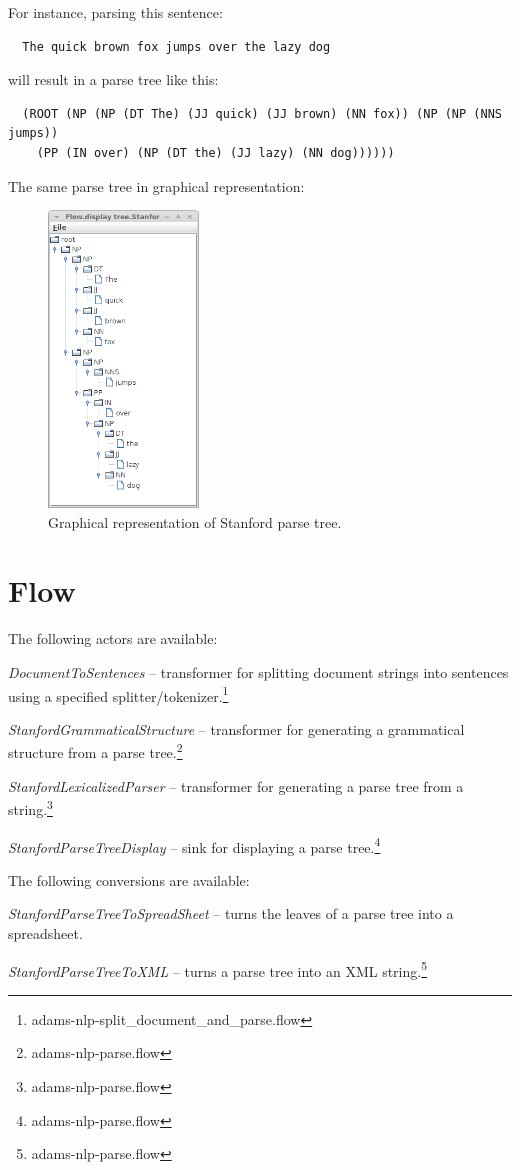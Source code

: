 \documentclass[a4paper]{book}
\begin{document}
\noindent For instance, parsing this sentence:
\begin{verbatim}
  The quick brown fox jumps over the lazy dog
\end{verbatim}
will result in a parse tree like this:
\begin{verbatim}
  (ROOT (NP (NP (DT The) (JJ quick) (JJ brown) (NN fox)) (NP (NP (NNS jumps)) 
    (PP (IN over) (NP (DT the) (JJ lazy) (NN dog))))))
\end{verbatim}
The same parse tree in graphical representation:
\begin{figure}[htb]
  \centering
  \includegraphics[width=4.0cm]{images/parse-tree.png}
  \caption{Graphical representation of Stanford parse tree.}
  \label{parse-tree}
\end{figure}

\chapter{Flow}
The following actors are available:
\begin{tight_itemize}
	\item \textit{DocumentToSentences} -- transformer for splitting document 
	strings into sentences using a specified 
	splitter/tokenizer.\footnote{adams-nlp-split\_document\_and\_parse.flow}
	\item \textit{StanfordGrammaticalStructure} -- transformer for generating a 
	grammatical structure from a parse tree.\footnote{adams-nlp-parse.flow}
	\item \textit{StanfordLexicalizedParser} -- transformer for generating a 
	parse tree from a string.\footnote{adams-nlp-parse.flow}
	\item \textit{StanfordParseTreeDisplay} -- sink for displaying a parse 
	tree.\footnote{adams-nlp-parse.flow}
\end{tight_itemize}
The following conversions are available:
\begin{tight_itemize}
    \item \textit{StanfordParseTreeToSpreadSheet} -- turns the leaves of a
    parse tree into a spreadsheet.
	\item \textit{StanfordParseTreeToXML} -- turns a parse tree into an 
	XML string.\footnote{adams-nlp-parse.flow}
\end{tight_itemize}


\end{document}
